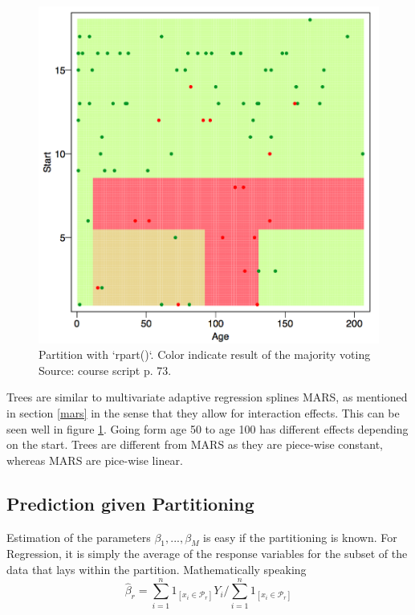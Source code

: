\documentclass[]{book}
\begin{document}
\begin{figure}
\includegraphics[width=12.15in]{figures/tree-partitioning} \caption{Partition with `rpart()`. Color indicate result of the majority voting Source: course script p. 73.}\label{fig:treepart}
\end{figure}

Trees are similar to multivariate adaptive regression splines MARS, as
mentioned in section \ref{mars} in the sense that they allow for
interaction effects. This can be seen well in figure \ref{fig:treepart}.
Going form age 50 to age 100 has different effects depending on the
start. Trees are different from MARS as they are piece-wise constant,
whereas MARS are pice-wise linear.

\subsection{Prediction given
Partitioning}\label{prediction-given-partitioning}

Estimation of the parameters \(\beta_1, ..., \beta_M\) is easy if the
partitioning is known. For Regression, it is simply the average of the
response variables for the subset of the data that lays within the
partition. Mathematically speaking
\[ \hat{\beta}_r = \sum\limits_{i = 1}^n 1_{[x_i \in \mathcal{P}_r]} Y_i / 
\sum\limits_{i = 1}^n 1_{[x_i \in \mathcal{P}_r]}\]
\end{document}
